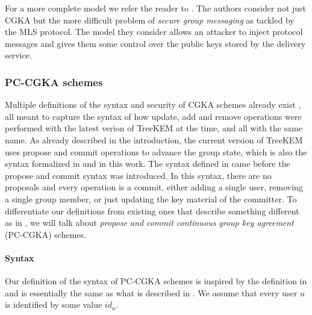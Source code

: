 For a more complete model we refer the reader to \cite{modular-group-messaging}. The authors consider not just CGKA but the more difficult problem of \emph{secure group messaging} as tackled by the MLS protocol. The model they consider allows an attacker to inject protocol messages and gives them some control over the public keys stored by the delivery service.

\subsubsection{PC-CGKA schemes}

Multiple definitions of the syntax and security of CGKA schemes already exist \cite{rtreekem,ttkem,modular-group-messaging}, all meant to capture the syntax of how update, add and remove operations were performed with the latest verion of TreeKEM at the time, and all with the same name. As already described in the introduction, the current version of TreeKEM uses propose and commit operations to advance the group state, which is also the syntax formalized in \cite{modular-group-messaging} and in this work. The syntax defined in \cite{rtreekem,ttkem} came before the propose and commit syntax was introduced. In this syntax, there are no proposals and every operation is a commit, either adding a single user, removing a single group member, or just updating the key material of the committer. To differentiate our definitions from existing ones that describe something different as in \cite{rtreekem,ttkem}, we will talk about \emph{propose and commit continuous group key agreement} (PC-CGKA) schemes.

\paragraph{Syntax}

Our definition of the syntax of PC-CGKA schemes is inspired by the definition in \cite{ttkem} and is essentially the same as what is described in \cite[Section 4.1.1]{modular-group-messaging}. We assume that every user $u$ is identified by some value $id_u$.

